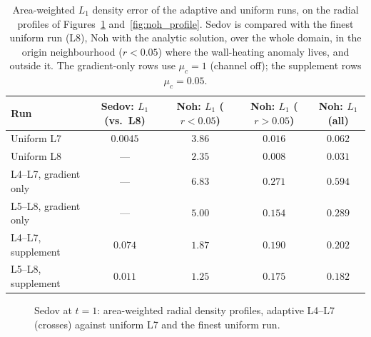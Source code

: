 \documentclass[a4paper]{cas-sc}
\begin{document}
\begin{table}[pos=htbp]
	\centering
	\caption{Area-weighted $L_1$ density error of the adaptive and uniform runs,
	on the radial profiles of Figures~\ref{fig:sedov_profile}
	and~\ref{fig:noh_profile}. Sedov is compared with the finest uniform run
	(L8), Noh with the analytic solution, over the whole domain, in the origin
	neighbourhood ($r<0.05$) where the wall-heating anomaly lives, and outside
	it. The gradient-only rows use $\mu_c=1$ (channel off); the supplement rows
	$\mu_c=0.05$.}
	\label{tab:radial_l1}
	\begin{tabular}{lcccc}
		\hline
		Run & Sedov: $L_1$ (vs.\ L8) & Noh: $L_1$ ($r<0.05$) & Noh: $L_1$ ($r>0.05$) & Noh: $L_1$ (all) \\
		\hline
		Uniform L7 & $0.0045$ & $3.86$ & $0.016$ & $0.062$ \\
		Uniform L8 & ---      & $2.35$ & $0.008$ & $0.031$ \\
		L4--L7, gradient only & --- & $6.83$ & $0.271$ & $0.594$ \\
		L5--L8, gradient only & --- & $5.00$ & $0.154$ & $0.289$ \\
		L4--L7, supplement & $0.074$ & $1.87$ & $0.190$ & $0.202$ \\
		L5--L8, supplement & $0.011$ & $1.25$ & $0.175$ & $0.182$ \\
		\hline
	\end{tabular}
\end{table}

\begin{figure}[pos=htbp]
	\centering
	\caption{Sedov at $t=1$: area-weighted radial density profiles, adaptive
	L4--L7 (crosses) against uniform L7 and the finest uniform run.}
	\label{fig:sedov_profile}
\end{figure}
\end{document}
